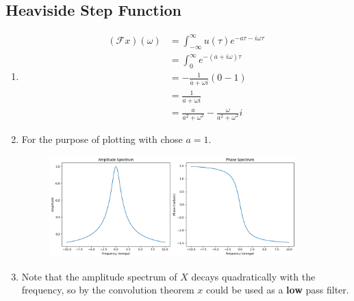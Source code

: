 \subsection{Heaviside Step Function}
\begin{enumerate}
  \item 
    \begin{equation}
      \begin{aligned}
        \left(\mathcal{F}x\right)(\omega) &= \int_{-\infty}^{\infty} u(\tau) e^{-a \tau -i \omega \tau} \\
        &= \int_{0}^{\infty} e^{-\left(a + i \omega\right)\tau} \\
        &= -\frac{1}{a + \omega i} \left(0 - 1\right) \\
        &= \frac{1}{a + \omega i} \\
        &= \frac{a }{a^2 + \omega^2} - \frac{\omega}{a^2 + \omega^2} i
      \end{aligned}
    \end{equation}
    
    \item For the purpose of plotting with chose $a=1$.
    \begin{figure}[h]
      \centering
      \includegraphics[width=0.9\textwidth]{from_gpt.png}
    \end{figure}

    \item Note that the amplitude spectrum of $X$ decays quadratically with the frequency, so by the convolution theorem $x$ could be used as a \textbf{low} pass filter.   
\end{enumerate}






